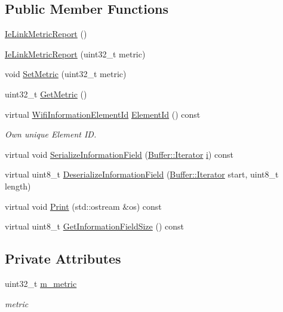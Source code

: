 \subsection*{Public Member Functions}
\begin{DoxyCompactItemize}
\item 
\hyperlink{classns3_1_1dot11s_1_1IeLinkMetricReport_aeed2c7a011fca7d60f62b1d8f0026462}{Ie\+Link\+Metric\+Report} ()
\item 
\hyperlink{classns3_1_1dot11s_1_1IeLinkMetricReport_a66448965050555533e89f9cabe5d88b7}{Ie\+Link\+Metric\+Report} (uint32\+\_\+t metric)
\item 
void \hyperlink{classns3_1_1dot11s_1_1IeLinkMetricReport_adb63706115fee20d23871cdc6c589568}{Set\+Metric} (uint32\+\_\+t metric)
\item 
uint32\+\_\+t \hyperlink{classns3_1_1dot11s_1_1IeLinkMetricReport_a198199e7b4392b0b63f63c74d4244445}{Get\+Metric} ()
\item 
virtual \hyperlink{namespacens3_aeb185e0c8a60816016bca079f1420478}{Wifi\+Information\+Element\+Id} \hyperlink{classns3_1_1dot11s_1_1IeLinkMetricReport_ad020af9652e5effe04bacb854337b208}{Element\+Id} () const 
\begin{DoxyCompactList}\small\item\em Own unique Element ID. \end{DoxyCompactList}\item 
virtual void \hyperlink{classns3_1_1dot11s_1_1IeLinkMetricReport_a8386e67aadcaa1e455cf7e1c06d47017}{Serialize\+Information\+Field} (\hyperlink{classns3_1_1Buffer_1_1Iterator}{Buffer\+::\+Iterator} \hyperlink{lte__uplink__power__control_8m_a6f6ccfcf58b31cb6412107d9d5281426}{i}) const 
\item 
virtual uint8\+\_\+t \hyperlink{classns3_1_1dot11s_1_1IeLinkMetricReport_a79315f0a48dd8df7a183889d7f63d7d6}{Deserialize\+Information\+Field} (\hyperlink{classns3_1_1Buffer_1_1Iterator}{Buffer\+::\+Iterator} start, uint8\+\_\+t length)
\item 
virtual void \hyperlink{classns3_1_1dot11s_1_1IeLinkMetricReport_afb4615f774e9123926b85fdd448047b9}{Print} (std\+::ostream \&os) const 
\item 
virtual uint8\+\_\+t \hyperlink{classns3_1_1dot11s_1_1IeLinkMetricReport_a34ff35b5713aecc39016d07e28a50657}{Get\+Information\+Field\+Size} () const 
\end{DoxyCompactItemize}
\subsection*{Private Attributes}
\begin{DoxyCompactItemize}
\item 
uint32\+\_\+t \hyperlink{classns3_1_1dot11s_1_1IeLinkMetricReport_a4ba82dbff2ea7432a26d66228355cef6}{m\+\_\+metric}
\begin{DoxyCompactList}\small\item\em metric \end{DoxyCompactList}\end{DoxyCompactItemize}

